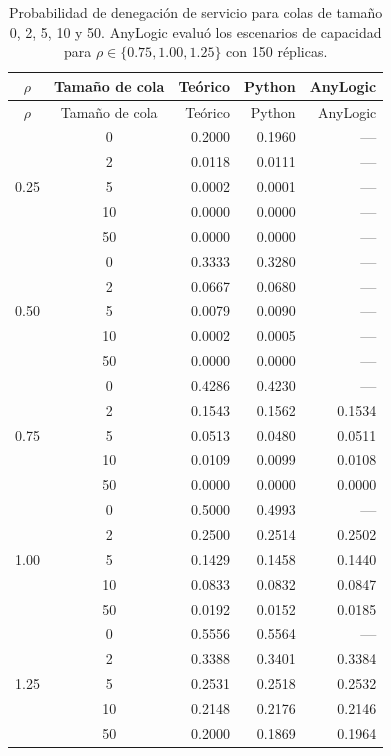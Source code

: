 \documentclass[11pt,a4paper]{article}
\newcommand{\AL}[0]{\textcolor{gray}{\textbf{---}}} %
\begin{document}
{\small
\begin{longtable}{ccrrr}
\caption{Probabilidad de denegación de servicio para colas de tamaño 0, 2,
5, 10 y 50. AnyLogic evaluó los escenarios de capacidad para
$\rho \in \{0.75, 1.00, 1.25\}$ con 150 réplicas.}
\label{tab:mm1-denegacion} \\
\toprule
$\rho$ & Tamaño de cola & Teórico & Python & AnyLogic \\
\midrule
\endfirsthead
\toprule
$\rho$ & Tamaño de cola & Teórico & Python & AnyLogic \\
\midrule
\endhead
\multirow{5}{*}{0.25}
 & 0 & 0.2000 & 0.1960 & \AL \\ & 2 & 0.0118 & 0.0111 & \AL \\
 & 5 & 0.0002 & 0.0001 & \AL \\ & 10 & 0.0000 & 0.0000 & \AL \\ & 50 & 0.0000 & 0.0000 & \AL \\
\midrule
\multirow{5}{*}{0.50}
 & 0 & 0.3333 & 0.3280 & \AL \\ & 2 & 0.0667 & 0.0680 & \AL \\
 & 5 & 0.0079 & 0.0090 & \AL \\ & 10 & 0.0002 & 0.0005 & \AL \\ & 50 & 0.0000 & 0.0000 & \AL \\
\midrule
\multirow{5}{*}{0.75}
 & 0 & 0.4286 & 0.4230 & \AL \\ & 2 & 0.1543 & 0.1562 & 0.1534 \\
 & 5 & 0.0513 & 0.0480 & 0.0511 \\ & 10 & 0.0109 & 0.0099 & 0.0108 \\ & 50 & 0.0000 & 0.0000 & 0.0000 \\
\midrule
\multirow{5}{*}{1.00}
 & 0 & 0.5000 & 0.4993 & \AL \\ & 2 & 0.2500 & 0.2514 & 0.2502 \\
 & 5 & 0.1429 & 0.1458 & 0.1440 \\ & 10 & 0.0833 & 0.0832 & 0.0847 \\ & 50 & 0.0192 & 0.0152 & 0.0185 \\
\midrule
\multirow{5}{*}{1.25}
 & 0 & 0.5556 & 0.5564 & \AL \\ & 2 & 0.3388 & 0.3401 & 0.3384 \\
 & 5 & 0.2531 & 0.2518 & 0.2532 \\ & 10 & 0.2148 & 0.2176 & 0.2146 \\ & 50 & 0.2000 & 0.1869 & 0.1964 \\
\bottomrule
\end{longtable}
}
\end{document}
